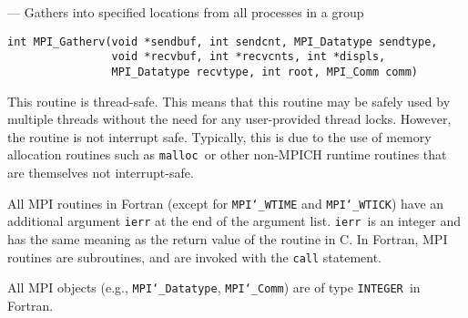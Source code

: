 \startmanpage
{}
--- Gathers into specified locations from all processes in a group 
\startvb\begin{verbatim}
int MPI_Gatherv(void *sendbuf, int sendcnt, MPI_Datatype sendtype, 
                void *recvbuf, int *recvcnts, int *displs, 
                MPI_Datatype recvtype, int root, MPI_Comm comm)

\end{verbatim}
\endvb

\par
{}
\par
{}
\par
This routine is thread-safe.  This means that this routine may be
safely used by multiple threads without the need for any user-provided
thread locks.  However, the routine is not interrupt safe.  Typically,
this is due to the use of memory allocation routines such as {\tt malloc
}or other non-MPICH runtime routines that are themselves not interrupt-safe.
\par
{}
All MPI routines in Fortran (except for {\tt MPI{\tt \char`\_}WTIME} and {\tt MPI{\tt \char`\_}WTICK}) have
an additional argument {\tt ierr} at the end of the argument list.  {\tt ierr
}is an integer and has the same meaning as the return value of the routine
in C.  In Fortran, MPI routines are subroutines, and are invoked with the
{\tt call} statement.
\par
All MPI objects (e.g., {\tt MPI{\tt \char`\_}Datatype}, {\tt MPI{\tt \char`\_}Comm}) are of type {\tt INTEGER
}in Fortran.
